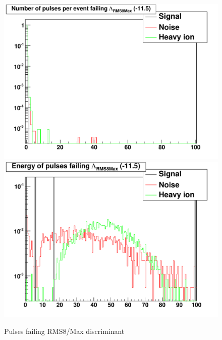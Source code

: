 \begin{figure}
\includegraphics[width=120mm]{DailyLog/6352/6352_Comparison20_Comparison_HFailLambdaRMS8MaxCount}
\includegraphics[width=120mm]{DailyLog/6352/6352_Comparison20_Comparison_HFailLambdaRMS8MaxEnergy}
\caption{Pulses failing RMS8/Max discriminant}
\label{Figure_6352_FailRMS8Max_Comparison}
\end{figure}

